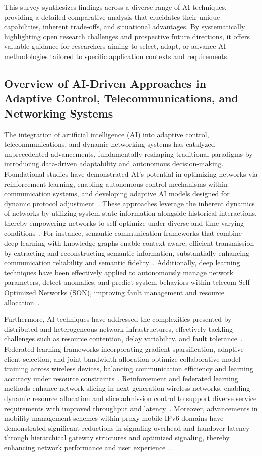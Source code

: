 \documentclass[sigconf]{acmart}
\begin{document}
This survey synthesizes findings across a diverse range of AI techniques, providing a detailed comparative analysis that elucidates their unique capabilities, inherent trade-offs, and situational advantages. By systematically highlighting open research challenges and prospective future directions, it offers valuable guidance for researchers aiming to select, adapt, or advance AI methodologies tailored to specific application contexts and requirements.

\subsection{Overview of AI-Driven Approaches in Adaptive Control, Telecommunications, and Networking Systems}

The integration of artificial intelligence (AI) into adaptive control, telecommunications, and dynamic networking systems has catalyzed unprecedented advancements, fundamentally reshaping traditional paradigms by introducing data-driven adaptability and autonomous decision-making. Foundational studies have demonstrated AI's potential in optimizing networks via reinforcement learning, enabling autonomous control mechanisms within communication systems, and developing adaptive AI models designed for dynamic protocol adjustment~\cite{ref17,ref18,ref19,ref20}. These approaches leverage the inherent dynamics of networks by utilizing system state information alongside historical interactions, thereby empowering networks to self-optimize under diverse and time-varying conditions~\cite{ref1,ref2,ref3}. For instance, semantic communication frameworks that combine deep learning with knowledge graphs enable context-aware, efficient transmission by extracting and reconstructing semantic information, substantially enhancing communication reliability and semantic fidelity~\cite{ref1}. Additionally, deep learning techniques have been effectively applied to autonomously manage network parameters, detect anomalies, and predict system behaviors within telecom Self-Optimized Networks (SON), improving fault management and resource allocation~\cite{ref2}.

Furthermore, AI techniques have addressed the complexities presented by distributed and heterogeneous network infrastructures, effectively tackling challenges such as resource contention, delay variability, and fault tolerance~\cite{ref4,ref5,ref6}. Federated learning frameworks incorporating gradient sparsification, adaptive client selection, and joint bandwidth allocation optimize collaborative model training across wireless devices, balancing communication efficiency and learning accuracy under resource constraints~\cite{ref4,ref5}. Reinforcement and federated learning methods enhance network slicing in next-generation wireless networks, enabling dynamic resource allocation and slice admission control to support diverse service requirements with improved throughput and latency~\cite{ref6}. Moreover, advancements in mobility management schemes within proxy mobile IPv6 domains have demonstrated significant reductions in signaling overhead and handover latency through hierarchical gateway structures and optimized signaling, thereby enhancing network performance and user experience~\cite{ref19}.
\end{document}
